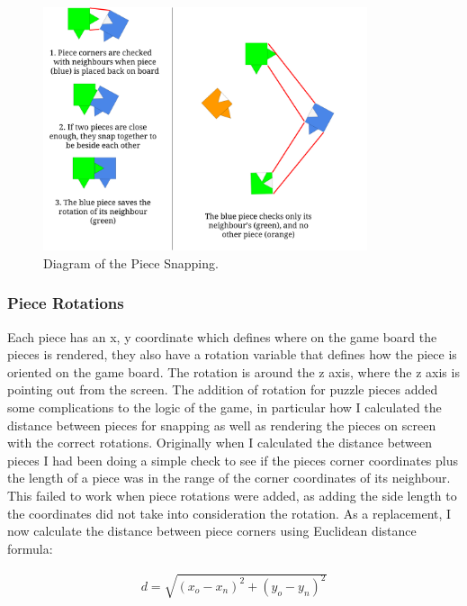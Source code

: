 \documentclass{article}
\begin{document}
\begin{figure}[ht]
\begin{center}
\includegraphics[width=0.85\textwidth, center]{images/PieceSnappingDiagram}
\caption{Diagram of the Piece Snapping.}
\label{fig:PieceSnapping}
\end{center}
\end{figure}

\subsubsection{Piece Rotations}
Each piece has an x, y coordinate which defines where on the game board the
pieces is rendered, they also have a rotation variable that defines how the
piece is oriented on the game board. The rotation is around the z axis, where
the z axis is pointing out from the screen. The addition of rotation for puzzle
pieces added some complications to the logic of the game, in particular how I
calculated the distance between pieces for snapping as well as rendering the
pieces on screen with the correct rotations. Originally when I calculated the
distance between pieces I had been doing a simple check to see if the pieces
corner coordinates plus the length of a piece was in the range of the corner
coordinates of its neighbour. This failed to work when piece rotations were
added, as adding the side length to the coordinates did not take into
consideration the rotation. As a replacement, I now calculate the distance
between piece corners using Euclidean distance formula: 

\begin{equation*}
\begin{aligned}
d = \sqrt{(x_o - x_n)^2 + (y_o - y_n)^2}
\end{aligned}
\end{equation*}
\end{document}
